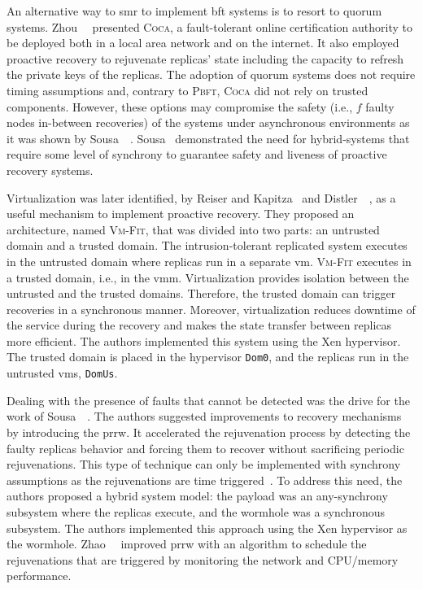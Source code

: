 An alternative way to \gls{smr} to implement \gls{bft} systems is to resort to quorum systems.
Zhou~\etal{}~\cite{Zhou:2002} presented \textsc{Coca}, a fault-tolerant online certification authority to be deployed both in a local area network and on the internet.
It also employed proactive recovery to rejuvenate replicas' state including the capacity to refresh the private keys of the replicas.
The adoption of quorum systems does not require timing assumptions and, contrary to \textsc{Pbft}, \textsc{Coca} did not rely on trusted components.
However, these options may compromise the safety (i.e., $f$ faulty nodes in-between recoveries) of the systems under asynchronous environments as it was shown by Sousa~\etal{}~\cite{Sousa:2007}. 
Sousa~\etal{} demonstrated the need for hybrid-systems that require some level of synchrony to guarantee safety and liveness of proactive recovery systems.


Virtualization was later identified, by Reiser and Kapitza~\cite{Reiser:2007} and Distler~\etal{}~\cite{Distler:2008}, as a useful mechanism to implement proactive recovery.
They proposed an architecture, named \textsc{Vm-Fit}, that was divided into two parts: an untrusted domain and a trusted domain.
The intrusion-tolerant replicated system executes in the untrusted domain where replicas run in a separate \gls{vm}. 
\textsc{Vm-Fit} executes in a trusted domain, i.e., in the \gls{vmm}. 
Virtualization provides isolation between the untrusted and the trusted domains. 
Therefore, the trusted domain can trigger recoveries in a synchronous manner. 
Moreover, virtualization reduces downtime of the service during the recovery and makes the state transfer between replicas more efficient. 
The authors implemented this system using the Xen hypervisor.
The trusted domain is placed in the hypervisor \texttt{Dom0}, and the replicas run in the untrusted \glspl{vm}, \texttt{DomUs}.

Dealing with the presence of faults that cannot be detected was the drive for the work of Sousa~\etal{}~\cite{Sousa:2010}.
The authors suggested improvements to recovery mechanisms by introducing the \gls{prrw}. 
It accelerated the rejuvenation process by detecting the faulty replicas behavior and forcing them to recover without sacrificing periodic rejuvenations. 
This type of technique can only be implemented with synchrony assumptions as the rejuvenations are time triggered~\cite{Sousa:2005}. 
To address this need, the authors proposed a hybrid system model: the payload was an any-synchrony subsystem where the replicas execute, and the wormhole was a synchronous subsystem. 
The authors implemented this approach using the Xen hypervisor as the wormhole. 
Zhao~\etal{}~\cite{Zhao:2012} improved \gls{prrw} with an algorithm to schedule the rejuvenations that are triggered by monitoring the network and CPU/memory performance.


